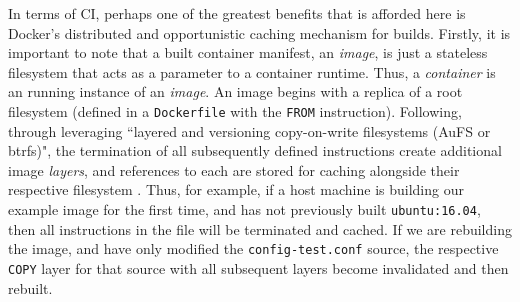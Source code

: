 \documentclass{report}
\begin{document}
\par
In terms of CI, perhaps one of the greatest benefits that is afforded here is 
Docker's distributed and opportunistic caching mechanism for builds.
Firstly, it is important to note that a built container manifest, an \textit{image}, is just a stateless filesystem that acts
as a parameter to a container runtime. Thus, a \textit{container} is an running instance of an \textit{image}.
An image begins with a replica of a root filesystem (defined in a \texttt{Dockerfile} with the \texttt{FROM} instruction).
Following, through leveraging ``layered and versioning
copy-on-write filesystems (AuFS or btrfs)", the termination of
all subsequently defined instructions create additional image \textit{layers}, and references to each are
stored for caching alongside their respective filesystem \citep{Arndt}. Thus, for example,
if a host machine is building our example image for the first time, and has not previously
built  \texttt{ubuntu:16.04}, then all instructions in the file will be terminated and cached.
If we are rebuilding the image, and have only modified the \texttt{config-test.conf} source, 
the respective \texttt{COPY} layer for that source with all subsequent layers become invalidated and then rebuilt.
\end{document}
